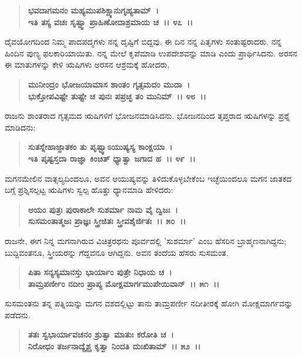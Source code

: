 \begin{verse}
\textbf{ಭವದಾಗಮನಂ ಮಹ್ಯಮುಪಶಿಕ್ಷ್ಯಾನುಗೃಹ್ಯತಾಮ್~।}\\\textbf{ಇತಿ ತಸ್ಯ ವಚಃ ಸೃಷ್ಟ್ವಾ ಪ್ರಾಹಿಣೋದಾಶ್ರಮಾಯ ಚ~।। ೪೭~।।}
\end{verse}

ದೈವಯೋಗದಿಂದ ನಿಮ್ಮ ಪಾದಪದ್ಮಗಳು ನನ್ನ ದೃಷ್ಟಿಗೆ ಬಿದ್ದವು. ಈ ದಿನ ನನ್ನ ಪಿತೃಗಳು ಸಂತುಷ್ಟರಾದರು. ನನ್ನ ಹಿಂದಿನ ಪುಣ್ಯ ಫಲಕಾರಿಯಾಯಿತು. ನನ್ನ ಮೇಲೆ ಕೃಪೆಮಾಡಿ ಉಪದೇಶವನ್ನು ಮಾಡಿ ಎಂದು ಪ್ರಾರ್ಥಿಸಿದನು. ಅರಸನ ಈ ಮಾತುಗಳನ್ನು ಕೇಳಿ ಋಷಿಗಳು ಅರಸನ ಆಶ್ರಮಕ್ಕೆ ಹೋದರು,

\begin{verse}
\textbf{ಮುನೀಂದ್ರಂ ಭೋಜಯಾಮಾಸ ಶಾಂತಂ ಗೃತ್ಸಮದಂ ಮುದಾ~।}\\\textbf{ಭುಕ್ತೋಪವಿಷ್ಟೇ ತುಷ್ಟೇ ಚ ಪುನಃ ಪಪ್ರಚ್ಛ ತಂ ಮುನಿಮ್~।। ೪೮~।।}
\end{verse}

ರಾಜನು ಶಾಂತರಾದ ಗೃತ್ಸಮದ ಋಷಿಗಳಿಗೆ ಭೋಜನಮಾಡಿಸಿದನು. ಭೋಜನದಿಂದ ತೃಪ್ತರಾದ ಋಷಿಗಳನ್ನು ಪ್ರಶ್ನೆ ಮಾಡಿದನು:

\begin{verse}
\textbf{ಸುತಸ್ನೇಹಾಜ್ಜಾತಕಂ ತು ಪೃಷ್ಟ್ವಾಽಯುಷ್ಯಸ್ಯ ಕಾಂಕ್ಷಯಾ~।}\\\textbf{ಇತಿ ಪೃಷ್ಟಸ್ತದಾ ರಾಜ್ಞಾ ಕಿಂಚಿತ್ ಧ್ಯಾತ್ವಾ ಜಗಾದ ಹ~।। ೪೯~।।}
\end{verse}

ಮಗನಮೇಲಿನ ವಾತ್ಸಲ್ಯದಿಂದಲೂ, ಅವನ ಆಯುಷ್ಯವನ್ನು ತಿಳಿದುಕೊಳ್ಳಬೇಕೆಂಬ ಇಚ್ಛೆಯಿಂದಲೂ ಮಗನ ಜಾತಕದ ಬಗ್ಗೆ ಪ್ರಶ್ನಿಸಲ್ಪಟ್ಟ ಋಷಿಗಳು ಸ್ವಲ್ಪ ಹೊತ್ತು ಧ್ಯಾನಮಾಡಿ ಹೇಳಿದರು:

\begin{verse}
\textbf{ಅಯಂ ಪುತ್ರಃ ಪುರಾಕಾಲೇ ಸುಶರ್ಮಾ ನಾಮ ವೈ ದ್ವಿಜಃ~।}\\\textbf{ಸುಸಮಂತಾತ್ಮಜಃ ಪ್ರಾಜ್ಞಃ ಸ್ತ್ರೀಜಿತಃ ಸ್ತ್ರೀವಶೈರ್ಜಿತಃ~।। ೫೦~।।}
\end{verse}

ರಾಜನೇ, ಈಗ ನಿನ್ನ ಮಗನಾಗಿರುವ ವಿಚಿತ್ರರಥನು ಪೂರ್ವದಲ್ಲಿ 'ಸುಶರ್ಮಾ' ಎಂಬ ಹೆಸರಿನ ಬ್ರಾಹ್ಮಣನಾಗಿದ್ದನು; ಬುದ್ದಿವಂತನೂ, ಸ್ತ್ರೀಯರನ್ನು ಗೆದ್ದವನೂ ಆಗಿದ್ದನು. ಅವನ ತಂದೆಯ ಹೆಸರು ಸುಸಮಂತ.

\begin{verse}
\textbf{ಪಿತಾ ಸನ್ಯಸ್ಯಮಾನಸ್ತು ಭಾರ್ಯಾಂ ಪುತ್ರೇ ನಿಧಾಯ ಚ~।}\\\textbf{ತಾಮ್ರಪರ್ಣೀಂ ನದೀಂ ಪ್ರಾಪ್ಯ ಮೋಕ್ಷಮಾರ್ಗಮುಪೇಯಿವಾನ್~।। ೫೧~।।}
\end{verse}

ಸುಸಮಂತನು ತನ್ನ ಪತ್ನಿಯನ್ನು ಮಗನ ವಶದಲ್ಲಿಟ್ಟು ತಾನು ತಾಮ್ರಪರ್ಣೀ ನದೀತೀರಕ್ಕೆ ಹೋಗಿ ಮೋಕ್ಷಮಾರ್ಗವನ್ನು ಪಡೆದನು.

\begin{verse}
\textbf{ತತಃ ಸ್ವಭಾರ್ಯಾವಚನಂ ಶ್ರುತ್ವಾ ಮಾತುಃ ಕರೋತಿ ಚ~।}\\\textbf{ನಿರೋಧಂ ತರ್ಜನಾದ್ಯೈಶ್ಚ ಕೃತ್ವಾ ನಿಂದತಿ ದುಃಖಿತಾಮ್~।। ೫೨~।। }
\end{verse}

